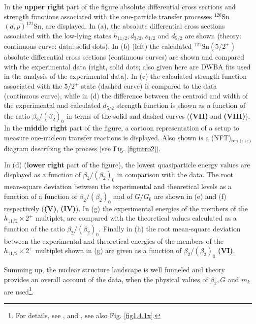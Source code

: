    In the  \textbf{upper right} part of the figure absolute differential cross sections and strength functions associated with the one-particle transfer processes $^{120}$Sn$(d,p)^{121}$Sn, are displayed. In  (a), the absolute differential cross sections associated with the low-lying  states $h_{11/2},d_{3/2},s_{1/2}$ and $d_{5/2}$ are shown (theory: continuous curve; data: solid dots). In (b) (left) the calculated $^{121}$Sn$(5/2^+)$ absolute differential cross sections (continuous curves) are shown and compared with the experimental data (right, solid dots; also given here are DWBA fits used in the analysis of the experimental data). In (c)  the calculated strength function associated with the $5/2^+$ state (dashed curve) is compared to the data (continuous curve), while in  (d) the difference between the centroid and  width of the experimental and calculated $d_{5/2}$ strength function  is shown as a function of the ratio $\beta_2/(\beta_2)_0$ in terms of the solid and dashed curves (\textbf{(VII)} and \textbf{(VIII)}).
    In the \textbf{middle right} part of the figure, a cartoon representation of a setup to measure one-nucleon transfer reactions is displayed. Also shown is a (NFT)$_{\text{ren (s+r)}}$ diagram  describing the process (see Fig. \ref{figintro2}).
    
    
      In (d)  (\textbf{lower right} part of the figure), the lowest quasiparticle energy values are displayed as a function of $\beta_2/(\beta_2)_0$ in comparison with the data.  The root mean-square deviation between the experimental and theoretical levels as a function of a function of  $\beta_2/(\beta_2)_0$ and  of $G/G_0$ are shown in (e) and (f) respectively (\textbf{(V)}, \textbf{(IV)}). In (g) the  experimental energies of the members of the $h_{11/2}\times 2^+$  multiplet, are compared with the theoretical values calculated as a function of the ratio $\beta_2/(\beta_2)_0$. Finally in (h) the root mean-square deviation between the experimental and theoretical energies of the members of the $h_{11/2}\times 2^+$ multiplet shown in (g) are given as a function of $\beta_2/(\beta_2)_0$ \textbf{(VI)}. 
  
  
  Summing up, the nuclear structure landscape is well funneled and  theory provides an overall account of the data, when the physical values of $\beta_2,G$ and $m_k$ are used\footnote{For details, see \cite{Idini:15}, and \cite{Broglia:16}, see also  Fig. \ref{fig1.4.1x}.}.

